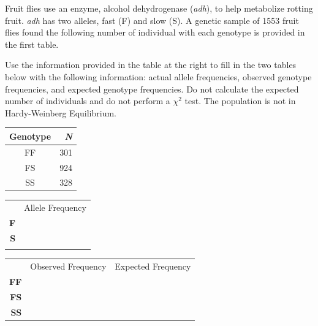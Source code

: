
\question[15]
Fruit flies use an enzyme, alcohol dehydrogenase (\emph{adh}), to help metabolize rotting fruit. \emph{adh} has two alleles, fast (F) and slow (S).  A genetic sample of 1553 fruit flies found the following number of individual with each genotype is provided in the first table.

\vspace{\baselineskip}

\begin{minipage}{0.6\linewidth}
Use the information provided in the table at the right to fill in the two tables below with the following information: actual allele frequencies, observed genotype frequencies, and expected genotype frequencies.  Do not calculate the expected number of individuals and do not perform a $\chi^2$ test. The population is not in Hardy-Weinberg Equilibrium.
\end{minipage}\hfill
\begin{minipage}{0.3\linewidth}
	\begin{tabular}{cr}
	\toprule
	Genotype	&	\emph{N}\\
	\midrule
	FF	&	301\\
	FS	&	924\\
	SS	&	328\\
	\bottomrule
	\end{tabular}\vfill
\end{minipage}

\vspace{\baselineskip}

\begin{minipage}{0.3\linewidth}
	\begin{tabular}{rc}
	&	Allele Frequency\\[3ex]
	\Large\textbf{F} & \makebox[3cm]{\hrulefill}\\[3ex]
	\Large\textbf{S} & \makebox[3cm]{\hrulefill}\\[3ex]
	\Large\null	 & \null\\
	\end{tabular}
\end{minipage}\hfill
\begin{minipage}{0.6\linewidth}
	\begin{tabular}{rcc}
		&	Observed Frequency		&	Expected Frequency\\[3ex]
		\large\textbf{FF} & \makebox[3cm]{\hrulefill} & \makebox[3cm]{\hrulefill} \\[3ex]
		\large\textbf{FS} & \makebox[3cm]{\hrulefill} & \makebox[3cm]{\hrulefill} \\[3ex]
		\large\textbf{SS} & \makebox[3cm]{\hrulefill} & \makebox[3cm]{\hrulefill} \\
	\end{tabular}
\end{minipage}



